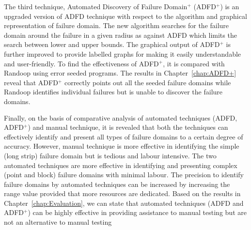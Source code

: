The third technique, Automated Discovery of Failure Domain$^+$ (ADFD$^+$) is an upgraded version of ADFD technique with respect to the algorithm and graphical representation of failure domain. The new algorithm searches for the failure domain around the failure in a given radius as against ADFD which limits the search between lower and upper bounds. The graphical output of ADFD$^+$ is further improved to provide labelled graphs for making it easily understandable and user-friendly. To find the effectiveness of ADFD$^+$, it is compared with Randoop using error seeded programs. The results in Chapter~\ref{chap:ADFD+} reveal that ADFD$^+$ correctly points out all the seeded failure domains while Randoop identifies individual failures but is unable to discover the failure domains. 

Finally, on the basis of comparative analysis of automated techniques (ADFD, ADFD$^+$) and manual technique, it is revealed that both the techniques can effectively identify and present all types of failure domains to a certain degree of accuracy. However, manual technique is more effective in identifying the simple (long strip) failure domain but is tedious and labour intensive. The two automated techniques are more effective in identifying and presenting complex (point and block) failure domains with minimal labour. The precision to identify failure domains by automated techniques can be increased by increasing the range value provided that more resources are dedicated. Based on the results in Chapter~\ref{chap:Evaluation}, we can state that automated techniques (ADFD and ADFD$^+$) can be highly effective in providing assistance to manual testing but are not an alternative to manual testing






